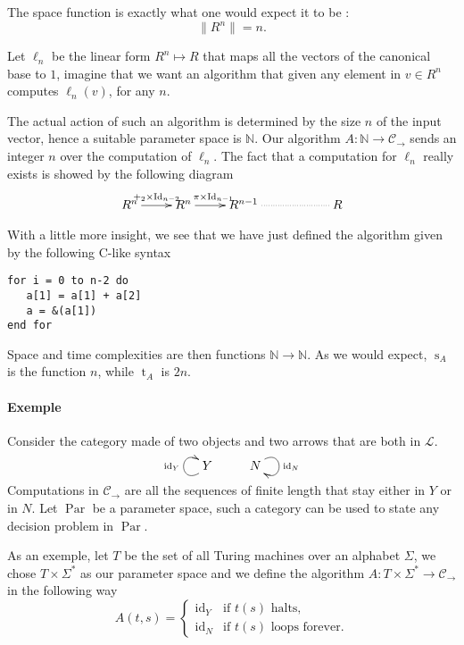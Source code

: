 \documentclass{article}
\newcommand{\cat}[1]{\mathscr{#1}}
\newcommand{\C}{\cat{C}}
\renewcommand{\L}{\cat{L}}
\newcommand{\size}[1]{\lVert#1\rVert}
\DeclareMathOperator{\id}{id}
\DeclareMathOperator{\Id}{Id}
\newcommand{\N}{\mathbb{N}}
\newcommand{\ra}{\rightarrow}
\DeclareMathOperator{\Time}{t}
\DeclareMathOperator{\Space}{s}
\DeclareMathOperator{\Par}{Par}
\begin{document}
  The space function is exactly what one would expect it to be :
  \begin{equation}
    \size{R^n} = n \text{.}
  \end{equation}
  
  Let $\ell_n$ be the linear form $R^n\mapsto R$ that maps all the
  vectors of the canonical base to $1$, imagine that we want an
  algorithm that given any element in $v\in R^n$ computes $\ell_n(v)$,
  for any $n$.

  The actual action of such an algorithm is determined by the size $n$
  of the input vector, hence a suitable parameter space is $\N$. Our
  algorithm $A:\N\ra\C_\ra$ sends an integer $n$ over the computation
  of $\ell_n$. The fact that a computation for $\ell_n$ really exists
  is showed by the following diagram
  \[\xymatrix{
    R^n\ar[r]^{+_2\times{\Id_{n-2}}} & R^n\ar[r]^{\pi\times{\Id_{n-1}}} &
    R^{n-1} \ar@{.}[rr] && R
  }\]
  
  With a little more insight, we see that we have just defined the
  algorithm given by the following C-like syntax
  \begin{center}
    \begin{minipage}{0.7\textwidth}
\begin{verbatim}
for i = 0 to n-2 do
   a[1] = a[1] + a[2]
   a = &(a[1])
end for
\end{verbatim}
    \end{minipage}
  \end{center}

  Space and time complexities are then functions $\N\ra\N$. As we
  would expect, $\Space_A$ is the function $n$, while $\Time_A$ is
  $2n$.


  \paragraph{Exemple}
  Consider the category made of two objects and two arrows that are
  both in $\L$.
  \[\xymatrix{ Y \ar@(dl,ul)^{\id_Y} & N \ar@(ur,dr)^{\id_N} }\]
  Computations in $\C_\ra$ are all the sequences of finite length that
  stay either in $Y$ or in $N$. Let $\Par$ be a parameter space, such
  a category can be used to state any decision problem in $\Par$.

  As an exemple, let $T$ be the set of all Turing machines over an
  alphabet $\Sigma$, we chose $T\times\Sigma^\ast$ as our parameter
  space and we define the algorithm $A:T\times\Sigma^\ast\ra\C_\ra$ in
  the following way
  \begin{equation*}
    A(t,s) = \begin{cases}
      \id_Y & \text{if $t(s)$ halts,}\\
      \id_N & \text{if $t(s)$ loops forever.}
    \end{cases}
  \end{equation*}
  
\end{document}
